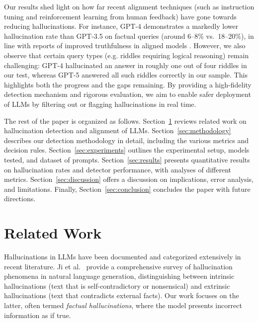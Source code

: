 \documentclass{article}
\begin{document}
Our results shed light on how far recent alignment techniques (such as instruction tuning and reinforcement learning from human feedback) have gone towards reducing hallucinations. For instance, GPT-4 demonstrates a markedly lower hallucination rate than GPT-3.5 on factual queries (around 6--8\% vs.\ 18--20\%), in line with reports of improved truthfulness in aligned models \cite{openai2023gpt4}. However, we also observe that certain query types (e.g. riddles requiring logical reasoning) remain challenging: GPT-4 hallucinated an answer in roughly one out of four riddles in our test, whereas GPT-5 answered all such riddles correctly in our sample. This highlights both the progress and the gaps remaining. By providing a high-fidelity detection mechanism and rigorous evaluation, we aim to enable safer deployment of LLMs by filtering out or flagging hallucinations in real time.

The rest of the paper is organized as follows. Section~\ref{sec:related} reviews related work on hallucination detection and alignment of LLMs. Section~\ref{sec:methodology} describes our detection methodology in detail, including the various metrics and decision rules. Section~\ref{sec:experiments} outlines the experimental setup, models tested, and dataset of prompts. Section~\ref{sec:results} presents quantitative results on hallucination rates and detector performance, with analyses of different metrics. Section~\ref{sec:discussion} offers a discussion on implications, error analysis, and limitations. Finally, Section~\ref{sec:conclusion} concludes the paper with future directions.

\section{Related Work}\label{sec:related}
Hallucinations in LLMs have been documented and categorized extensively in recent literature. Ji et al.~\cite{ji2023survey} provide a comprehensive survey of hallucination phenomena in natural language generation, distinguishing between intrinsic hallucinations (text that is self-contradictory or nonsensical) and extrinsic hallucinations (text that contradicts external facts). Our work focuses on the latter, often termed \textit{factual hallucinations}, where the model presents incorrect information as if true. 
\end{document}

